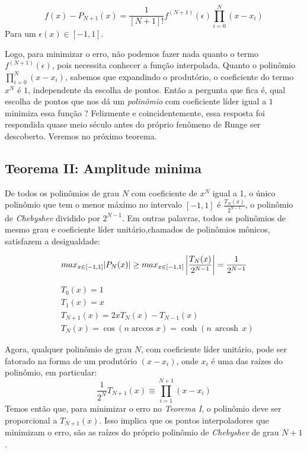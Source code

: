 \begin{equation}
 f(x) - P_{N+1}(x) = \frac{1}{[N+1]!}f^{(N+1)}(\epsilon)\prod^{N}_{i = 0} (x - x_i)
 \end{equation}
 Para um $\epsilon(x) \in [-1,1]$.
 
 Logo, para minimizar o erro, não podemos fazer nada quanto o termo $f^{(N+1)}(\epsilon)$, pois necessita conhecer a função interpolada. Quanto o polinômio $\prod^{N}_{i = 0} (x - x_i)$, sabemos que expandindo o produtório, o coeficiente do termo $x^N$ é $1$, independente da escolha de pontos. Então a pergunta que fica é, qual escolha de pontos que nos dá um \emph{polinômio} com coeficiente líder igual a $1$ minimiza essa função ? Felizmente e coincidentemente, essa resposta foi respondida quase meio século antes do próprio fenômeno de Runge ser descoberto. Veremos no próximo teorema.

 
\subsection{Teorema II: Amplitude minima} \label{subsec:TeoremaII}
 De todos os polinômios de grau $N$ com coeficiente de $x^N$ igual a 1, o único polinômio que tem o menor máximo no intervalo $[-1,1]$ é $\frac{T_N(x)}{2^{N-1}}$, o polinômio de \emph{Chebyshev}  dividido por $2^{N-1}$. Em outras palavras, todos os polinômios de mesmo grau e coeficiente líder unitário,chamados de polinômios mônicos, satisfazem a desigualdade:

\begin{equation}
	max_{x \in [-1,1]}|P_N(x)| \geq  max_{x \in [-1,1]} \left |\frac{T_N(x)}{2^{N-1}}  \right |  = \frac{1}{2^{N-1}}\\
\end{equation}

\begin{align}
    &T_0(x) = 1\\
    &T_1(x) = x\\
    &T_{N+1}(x) = 2xT_N(x) - T_{N-1}(x)\\
    &T_{N}(x) =\cos(n \arccos x)=\cosh(n\,\operatorname{arcosh}\,x)
\end{align}

 Agora, qualquer polinômio de grau $N$, com coeficiente líder unitário, pode ser fatorado na forma de um produtório  $(x - x_i)$, onde $x_i$ é uma das raízes do polinômio, em particular: 
 \begin{equation}
 \frac{1}{2^N}T_{N+1}(x) \equiv \prod_{i = 1}^{N+1} (x-x_i)
 \end{equation}
 Temos então que, para minimizar o erro no \emph{Teorema I}, o polinômio deve ser proporcional a $T_{N+1}(x)$. Isso implica que  os pontos interpoladores que minimizam o erro, são as raízes do próprio polinômio de \emph{Chebyshev} de grau $N+1$.
 
